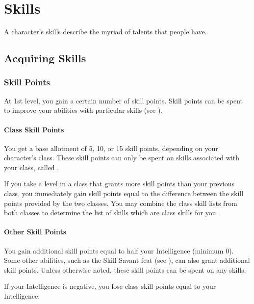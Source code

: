 \chapter{Skills}\label{Skills}

A character's skills describe the myriad of talents that people have.

\section{Acquiring Skills}

    \subsection{Skill Points}\label{Skill Points}

        At 1st level, you gain a certain number of skill points. Skill points can be spent to improve your abilities with particular skills (see ).

        \subsubsection{Class Skill Points}

            You get a base allotment of 5, 10, or 15 skill points, depending on your character's class. These skill points can only be spent on skills associated with your class, called .

             If you take a level in a class that grants more skill points than your previous class, you immediately gain skill points equal to the difference between the skill points provided by the two classes. You may combine the class skill lists from both classes to determine the list of skills which are class skills for you.

        \subsubsection{Other Skill Points}

            You gain additional skill points equal to half your Intelligence (minimum 0).  Some other abilities, such as the Skill Savant feat (see ), can also grant additional skill points. Unless otherwise noted, these skill points can be spent on any skills.

             If your Intelligence is negative, you lose class skill points equal to your Intelligence.

